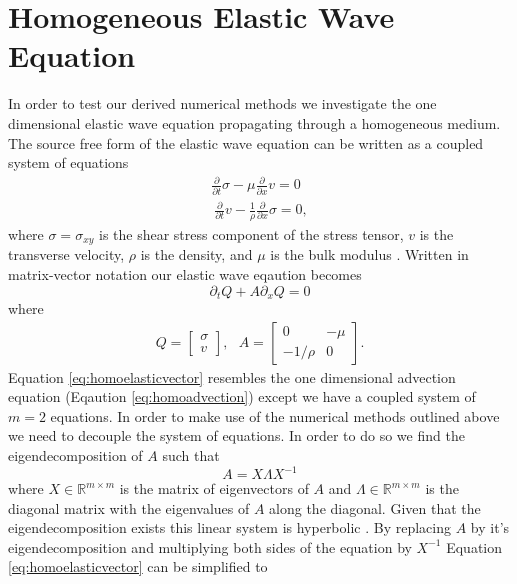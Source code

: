 \documentclass[review,onefignum,onetabnum]{siamart171218}
\begin{document}
\section{Homogeneous Elastic Wave Equation}
In order to test our derived numerical methods we investigate the one dimensional elastic wave equation propagating through a homogeneous medium. The source free form of the elastic wave equation can be written as a coupled system of equations
\begin{equation}
\begin{gathered}
    \frac{\partial}{\partial t}\sigma - \mu \frac{\partial}{\partial x} v = 0 \label{eq:elastic}\\
    \ \frac{\partial}{\partial t}v - \frac{1}{\rho} \frac{\partial}{\partial x} \sigma = 0, 
\end{gathered}
\end{equation}
where $\sigma = \sigma_{xy}$ is the shear stress component of the stress tensor, $v$ is the transverse velocity, $\rho$ is the density, and $\mu$ is the bulk modulus \cite{comp_seis}. Written in matrix-vector notation our elastic wave eqaution becomes
\begin{equation}
    \partial_t Q + A \partial_x Q = 0
    \label{eq:homoelasticvector}
\end{equation}
where 
\begin{align*}
    Q = \begin{bmatrix} \sigma \\ v\end{bmatrix}, \:\:\:  A = \begin{bmatrix} 0 & -\mu\\ -1/\rho & 0\end{bmatrix}.
\end{align*}
Equation \ref{eq:homoelasticvector} resembles the one dimensional advection equation (Eqaution \ref{eq:homoadvection}) except we have a coupled system of $m=2$ equations. In order to make use of the numerical methods outlined above we need to decouple the system of equations. In order to do so we find the eigendecomposition of $A$ such that
\begin{equation}
    A = X\Lambda X^{-1}
\end{equation}
where $X \in \mathbb{R}^{m\times m}$ is the matrix of eigenvectors of $A$ and $\Lambda  \in \mathbb{R}^{m\times m}$ is the diagonal matrix with the eigenvalues of $A$ along the diagonal. Given that the eigendecomposition exists this linear system is hyperbolic \cite{leveque_2002}. By replacing $A$ by it's eigendecomposition and multiplying both sides of the equation by $X^{-1}$ Equation \ref{eq:homoelasticvector} can be simplified to 
\end{document}
